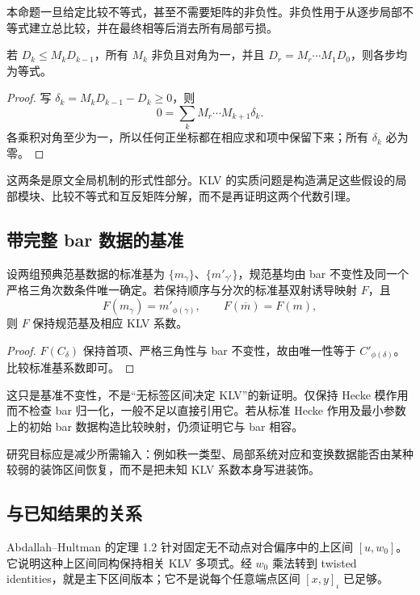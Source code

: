 本命题一旦给定比较不等式，甚至不需要矩阵的非负性。非负性用于从逐步局部不等式建立总比较，并在最终相等后消去所有局部亏损。

\begin{proposition}[亏损消失]\label{prop:defect-vanishing}
若 \(D_k\le M_kD_{k-1}\)，所有 \(M_k\) 非负且对角为一，并且
\(D_r=M_r\cdots M_1D_0\)，则各步均为等式。
\end{proposition}
\begin{proof}
写 \(\delta_k=M_kD_{k-1}-D_k\ge0\)，则
\[
0=\sum_k M_r\cdots M_{k+1}\delta_k.
\]
各乘积对角至少为一，所以任何正坐标都在相应求和项中保留下来；所有 \(\delta_k\) 必为零。
\end{proof}

这两条是原文全局机制的形式性部分。KLV 的实质问题是构造满足这些假设的局部模块、比较不等式和互反矩阵分解，而不是再证明这两个代数引理。

\subsection{带完整 bar 数据的基准}
\begin{proposition}\label{prop:bar-benchmark}
设两组预典范基数据的标准基为 \(\{m_\gamma\}\)、\(\{m'_{\gamma'}\}\)，规范基均由 bar 不变性及同一个严格三角次数条件唯一确定。若保持顺序与分次的标准基双射诱导映射 \(F\)，且
\[
F(m_\gamma)=m'_{\phi(\gamma)},\qquad
F(\overline m)=\overline{F(m)},
\]
则 \(F\) 保持规范基及相应 KLV 系数。
\end{proposition}
\begin{proof}
\(F(C_\delta)\) 保持首项、严格三角性与 bar 不变性，故由唯一性等于 \(C'_{\phi(\delta)}\)。比较标准基系数即可。
\end{proof}

这只是基准不变性，不是“无标签区间决定 KLV”的新证明。仅保持 Hecke 模作用而不检查 bar 归一化，一般不足以直接引用它。若从标准 Hecke 作用及最小参数上的初始 bar 数据构造比较映射，仍须证明它与 bar 相容。

研究目标应是减少所需输入：例如秩一类型、局部系统对应和变换数据能否由某种较弱的装饰区间恢复，而不是把未知 KLV 系数本身写进装饰。

\subsection{与已知结果的关系}
Abdallah--Hultman\cite{AH} 的定理 1.2 针对固定无不动点对合偏序中的上区间 \([u,w_0]\)。它说明这种上区间同构保持相关 KLV 多项式。经 \(w_0\) 乘法转到 twisted identities，就是主下区间版本；它不是说每个任意端点区间 \([x,y]_\iota\) 已足够。

